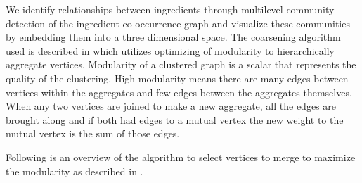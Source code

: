 \documentclass[conference]{IEEEtran}
\begin{document}
We identify relationships between ingredients through multilevel community detection of
the ingredient co-occurrence graph and visualize these communities by embedding them into a three
dimensional space. The coarsening algorithm used is described in \cite{Quiring19modularity} which utilizes
optimizing of modularity to hierarchically aggregate vertices. Modularity of a clustered graph
is a scalar that represents the quality of the clustering. High modularity means there are many
edges between vertices within the aggregates and few edges between the aggregates themselves.
When any two vertices are joined to make a new aggregate, all the edges are brought along and
if both had edges to a mutual vertex the new weight to the mutual vertex is the sum of those
edges.

Following is an overview of the algorithm to select vertices to merge to maximize
the modularity as described in \cite{Quiring19modularity}.
\end{document}
